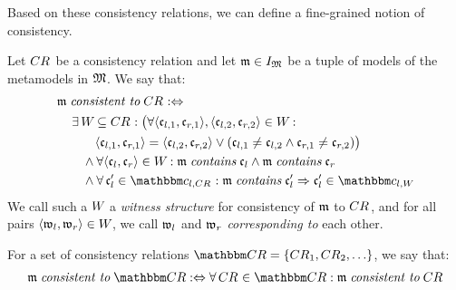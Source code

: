 Based on these consistency relations, we can define a fine-grained notion of consistency.

\begin{definition}[Consistency] \label{def:consistency}
    Let $\consistencyrelation{CR}{}$ be a consistency relation and let $\modeltuple{m} \in \metamodeltupleinstanceset{M}$ be a tuple of models of the metamodels in $\metamodeltuple{M}$.
    We say that:
     \begin{align*}
        & 
        \modeltuple{m} \consistenttomath \consistencyrelation{CR}{} \equivalentperdefinition \\
        & \formulaskip
        \exists \consistencyrelation{W}{} \subseteq \consistencyrelation{CR}{} : 
        \bigl( \forall \tupled{\conditionelement{c}{l,1}, \conditionelement{c}{r,1}}, \tupled{\conditionelement{c}{l,2}, \conditionelement{c}{r,2}} \in \consistencyrelation{W}{} : \\
        & \formulaskip\formulaskip\formulaskip
        \tupled{\conditionelement{c}{l,1}, \conditionelement{c}{r,1}} = \tupled{\conditionelement{c}{l,2}, \conditionelement{c}{r,2}} \lor 
        ( \conditionelement{c}{l,1} \neq \conditionelement{c}{l,2} \land \conditionelement{c}{r,1} \neq \conditionelement{c}{r,2}) \bigr) \\
        & \formulaskip\formulaskip
        \land \forall \tupled{\conditionelement{c}{l}, \conditionelement{c}{r}} \in  \consistencyrelation{W}{} : \modeltuple{m} \containsmath \conditionelement{c}{l} \land \modeltuple{m} \containsmath \conditionelement{c}{r} \\
        & \formulaskip\formulaskip
        \land \forall \conditionelement{c}{l}' \in \condition{c}{l,\consistencyrelation{CR}{}} : \modeltuple{m} \containsmath \conditionelement{c}{l}' \Rightarrow \conditionelement{c}{l}' \in \condition{c}{l,\consistencyrelation{W}{}}
    \end{align*}
    We call such a $\consistencyrelation{W}{}$ a \emph{witness structure} for consistency of $\modeltuple{m}$ to $\consistencyrelation{CR}{}$, and for all pairs $\tupled{\conditionelement{w}{l}, \conditionelement{w}{r}} \in \consistencyrelation{W}{}$, we call $\conditionelement{w}{l}$ and $\conditionelement{w}{r}$ \emph{corresponding to} each other.
    
    For a set of consistency relations $\consistencyrelationset{CR} = \setted{\consistencyrelation{CR}{1}, \consistencyrelation{CR}{2}, \dots}$, we say that:
    \begin{align*}
        \formulaskip &
        \modeltuple{m} \consistenttomath \consistencyrelationset{CR} \equivalentperdefinition
        \forall \consistencyrelation{CR}{} \in \consistencyrelationset{CR} : \modeltuple{m} \consistenttomath \consistencyrelation{CR}{}
    \end{align*}
\end{definition}

